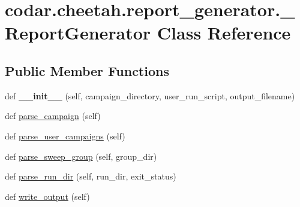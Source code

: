 \hypertarget{classcodar_1_1cheetah_1_1report__generator_1_1___report_generator}{}\section{codar.\+cheetah.\+report\+\_\+generator.\+\_\+\+Report\+Generator Class Reference}
\label{classcodar_1_1cheetah_1_1report__generator_1_1___report_generator}
\subsection*{Public Member Functions}
\begin{DoxyCompactItemize}
\item 
\mbox{\label{classcodar_1_1cheetah_1_1report__generator_1_1___report_generator_aaadff1978efa6b29137c24a5ae751a0a}} 
def {\bfseries \+\_\+\+\_\+init\+\_\+\+\_\+} (self, campaign\+\_\+directory, user\+\_\+run\+\_\+script, output\+\_\+filename)
\item 
def \hyperlink{classcodar_1_1cheetah_1_1report__generator_1_1___report_generator_af247fa30d32308bfa7119cebcf9e7742}{parse\+\_\+campaign} (self)
\item 
def \hyperlink{classcodar_1_1cheetah_1_1report__generator_1_1___report_generator_a252765e13f6227fa2b5bc439a3058017}{parse\+\_\+user\+\_\+campaigns} (self)
\item 
def \hyperlink{classcodar_1_1cheetah_1_1report__generator_1_1___report_generator_a3d382ee82b5ddfe83eb7c4ee5a82b40d}{parse\+\_\+sweep\+\_\+group} (self, group\+\_\+dir)
\item 
def \hyperlink{classcodar_1_1cheetah_1_1report__generator_1_1___report_generator_a73a4ffecbd6ea0a4f47fef44f094193b}{parse\+\_\+run\+\_\+dir} (self, run\+\_\+dir, exit\+\_\+status)
\item 
def \hyperlink{classcodar_1_1cheetah_1_1report__generator_1_1___report_generator_afa3df970816cabee4c9f898dd73db8ee}{write\+\_\+output} (self)
\end{DoxyCompactItemize}
